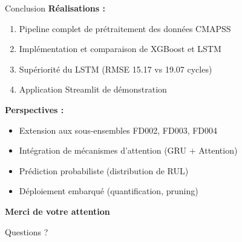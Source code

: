 \documentclass[aspectratio=169,11pt]{beamer}
\begin{document}
\begin{frame}{Conclusion}
\textbf{Réalisations :}
\begin{enumerate}
    \item Pipeline complet de prétraitement des données CMAPSS
    \item Implémentation et comparaison de XGBoost et LSTM
    \item Supériorité du LSTM (RMSE 15.17 vs 19.07 cycles)
    \item Application Streamlit de démonstration
\end{enumerate}
\vspace{0.3cm}
\textbf{Perspectives :}
\begin{itemize}
    \item Extension aux sous-ensembles FD002, FD003, FD004
    \item Intégration de mécanismes d'attention (GRU + Attention)
    \item Prédiction probabiliste (distribution de RUL)
    \item Déploiement embarqué (quantification, pruning)
\end{itemize}
\end{frame}

\begin{frame}
\begin{center}
{\Huge \textbf{Merci de votre attention}}
\vspace{1cm}

{\Large Questions ?}
\vspace{1.5cm}


\end{center}
\end{frame}
\end{document}
